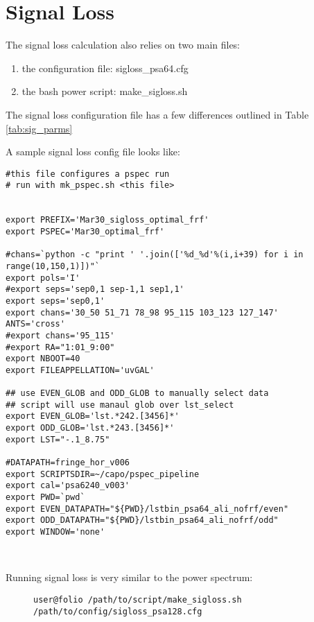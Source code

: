\documentclass[onecolumn]{emulateapj}
\begin{document}
\section{Signal Loss}
{
The signal loss calculation also relies on two main files:
\begin{enumerate}
\item the configuration file: sigloss\_psa64.cfg
\item the bash power script: make\_sigloss.sh
\end{enumerate}

The signal loss configuration file has a few differences outlined in Table \ref{tab:sig_parms}




A sample signal loss config file looks like: 



\begin{lstlisting}[name='sigloss_psa128.cfg']
#this file configures a pspec run
# run with mk_pspec.sh <this file>


export PREFIX='Mar30_sigloss_optimal_frf'
export PSPEC='Mar30_optimal_frf'

#chans=`python -c "print ' '.join(['%d_%d'%(i,i+39) for i in range(10,150,1)])"`
export pols='I'
#export seps='sep0,1 sep-1,1 sep1,1'
export seps='sep0,1'
export chans='30_50 51_71 78_98 95_115 103_123 127_147'
ANTS='cross'
#export chans='95_115'
#export RA="1:01_9:00"
export NBOOT=40
export FILEAPPELLATION='uvGAL'

## use EVEN_GLOB and ODD_GLOB to manually select data
## script will use manaul glob over lst_select
export EVEN_GLOB='lst.*242.[3456]*'
export ODD_GLOB='lst.*243.[3456]*'
export LST="-.1_8.75"

#DATAPATH=fringe_hor_v006
export SCRIPTSDIR=~/capo/pspec_pipeline
export cal='psa6240_v003'
export PWD=`pwd`
export EVEN_DATAPATH="${PWD}/lstbin_psa64_ali_nofrf/even"
export ODD_DATAPATH="${PWD}/lstbin_psa64_ali_nofrf/odd"
export WINDOW='none'
\end{lstlisting}
\ \newline

Running signal loss is very similar to the power spectrum:

\begin{figure}[h!]
\begin{lstlisting}[numbers=none]
user@folio /path/to/script/make_sigloss.sh /path/to/config/sigloss_psa128.cfg
\end{lstlisting}
\end{figure}

}
\end{document}
